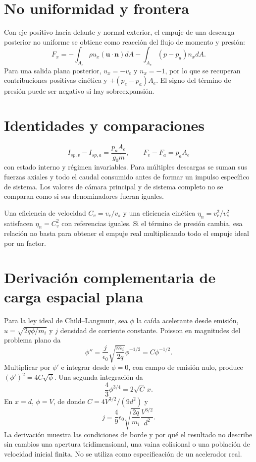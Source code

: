 \section{No uniformidad y frontera}
Con eje positivo hacia delante y normal exterior, el empuje de una descarga posterior no uniforme se obtiene como reacción del flujo de momento y presión:
\[
 F_x=-\int_{A_e}\rho u_x(\mathbf u\cdot\mathbf n)dA
 -\int_{A_e}(p-p_a)n_xdA.
\]
Para una salida plana posterior, $u_x=-v_e$ y $n_x=-1$, por lo que se recuperan contribuciones positivas cinética y $+(p_e-p_a)A_e$. El signo del término de presión puede ser negativo si hay sobreexpansión.
\section{Identidades y comparaciones}
\[
 I_{sp,v}-I_{sp,a}=\frac{p_aA_e}{g_0\dot m},\qquad
 F_v-F_a=p_aA_e
\]
con estado interno y régimen invariables. Para múltiples descargas se suman sus fuerzas axiales y todo el caudal consumido antes de formar un impulso específico de sistema. Los valores de cámara principal y de sistema completo no se comparan como si sus denominadores fueran iguales.

Una eficiencia de velocidad $C_v=v_r/v_s$ y una eficiencia cinética $\eta_n=v_r^2/v_s^2$ satisfacen $\eta_n=C_v^2$ con referencias iguales. Si el término de presión cambia, esa relación no basta para obtener el empuje real multiplicando todo el empuje ideal por un factor.
\section{Derivación complementaria de carga espacial plana}
Para la ley ideal de Child--Langmuir, sea $\phi$ la caída acelerante desde emisión, $u=\sqrt{2q\phi/m_i}$ y $j$ densidad de corriente constante. Poisson en magnitudes del problema plano da
\[
 \phi''=\frac j{\epsilon_0}\sqrt{\frac{m_i}{2q}}\phi^{-1/2}=C\phi^{-1/2}.
\]
Multiplicar por $\phi'$ e integrar desde $\phi=0$, con campo de emisión nulo, produce $(\phi')^2=4C\sqrt\phi$. Una segunda integración da
\[
 \frac43\phi^{3/4}=2\sqrt C\,x.
\]
En $x=d$, $\phi=V$, de donde $C=4V^{3/2}/(9d^2)$ y
\[
 j=\frac49\epsilon_0\sqrt{\frac{2q}{m_i}}\frac{V^{3/2}}{d^2}.
\]
La derivación muestra las condiciones de borde y por qué el resultado no describe sin cambios una apertura tridimensional, una vaina colisional o una población de velocidad inicial finita. No se utiliza como especificación de un acelerador real.\cite{JPL-EP}
